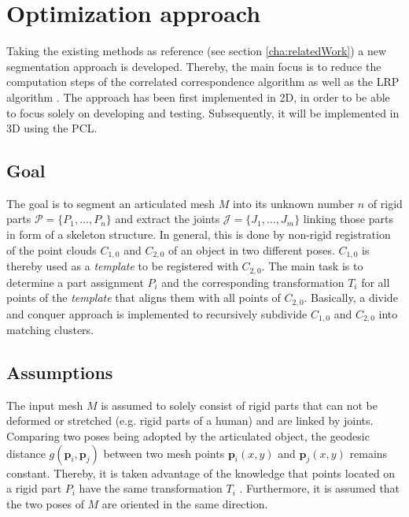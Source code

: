 \chapter{Optimization approach}
\label{cha:TheThesis}

Taking the existing methods as reference (see section \ref{cha:relatedWork}) a new segmentation approach is developed. Thereby, the main focus is to reduce the computation steps of the correlated correspondence algorithm \cite{CorrelatedCorrespondance} as well as the LRP algorithm \cite {guo2016correspondence}. The approach has been first implemented in 2D, in order to be able to focus solely on developing and testing. Subsequently, it will be implemented in 3D using the PCL.

\section{Goal}

The goal is to segment an articulated mesh $M$ into its unknown number $n$ of rigid parts $\mathcal{P} =  \{P_1,\ldots,P_n\}$ and extract the joints $\mathcal{J} =  \{J_1,\ldots,J_m\}$ linking those parts in form of a skeleton structure. In general, this is done by non-rigid registration of the point clouds $C_{1,0}$ and $C_{2,0}$ of an object in two different poses. $C_{1,0}$ is thereby used as a \textit{template} to be registered with $C_{2,0}$. The main task is to determine a part assignment $P_i$ and the corresponding transformation $T_i$ for all points of the \textit{template} that aligns them with all points of $C_{2,0}$. Basically, a divide and conquer approach is implemented to recursively subdivide $C_{1,0}$ and $C_{2,0}$ into matching clusters. 

\section{Assumptions}

The input mesh $M$ is assumed to solely consist of rigid parts that can not be deformed or stretched (e.g. rigid parts of a human) and are linked by joints. Comparing two poses being adopted by the articulated object, the geodesic distance $g(\boldsymbol{p}_i,\boldsymbol{p}_j)$ between two mesh points $\boldsymbol{p}_i(x,y)$ and $\boldsymbol{p}_j(x,y)$ remains constant. Thereby, it is taken advantage of the knowledge that points located on a rigid part $P_i$ have the same transformation $T_i$ . Furthermore, it is assumed that the two poses of $M$ are oriented in the same direction.

